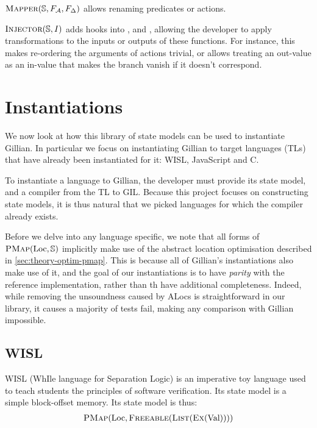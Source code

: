 $\textsc{Mapper}(\mathbb S, F_{\cal{A}}, F_\Delta)$ allows renaming predicates or actions.

$\textsc{Injector}(\mathbb S, I)$ adds hooks into \consume, \produce{} and \execac{}, allowing the developer to apply transformations to the inputs or outputs of these functions. For instance, this makes re-ordering the arguments of actions trivial, or allows treating an out-value as an in-value that makes the branch vanish if it doesn't correspond.

\section{Instantiations} \label{sec:impl-instantiations}

We now look at how this library of state models can be used to instantiate Gillian. In particular we focus on instantiating Gillian to target languages (TLs) that have already been instantiated for it: WISL, JavaScript and C.

To instantiate a language to Gillian, the developer must provide its state model, and a compiler from the TL to GIL. Because this project focuses on constructing state models, it is thus natural that we picked languages for which the compiler already exists.

Before we delve into any language specific, we note that all forms of $\textsc{PMap}(\text{Loc}, \mathbb S)$ implicitly make use of the abstract location optimisation described in \cref{sec:theory-optim-pmap}. This is because all of Gillian's instantiations also make use of it, and the goal of our instantiations is to have \emph{parity} with the reference implementation, rather than th have additional completeness. Indeed, while removing the unsoundness caused by ALocs is straightforward in our library, it causes a majority of tests fail, making any comparison with Gillian impossible.

\subsection{WISL}

WISL (WhIle language for Separation Logic) is an imperative toy language used to teach students the principles of software verification. Its state model is a simple block-offset memory. Its state model is thus: \begin{align*}
 	\textsc{PMap}(\text{Loc}, \textsc{Freeable}(\textsc{List}(\textsc{Ex}(\text{Val}))))
\end{align*}

